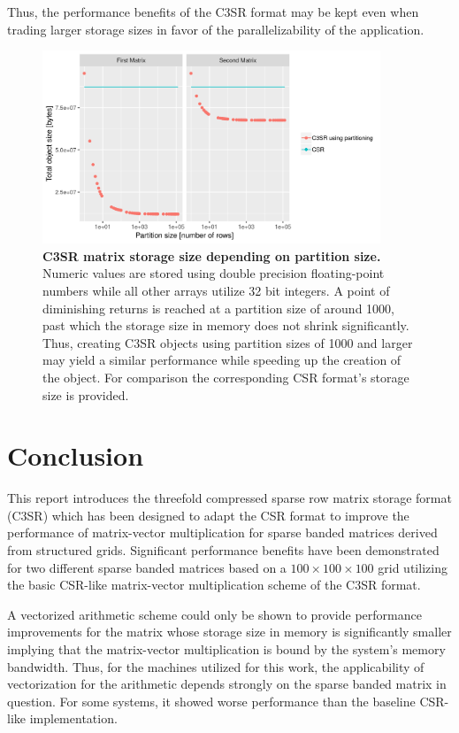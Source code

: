 \documentclass{article}
\begin{document}
    Thus, the performance benefits of the C3SR format may be kept even when trading larger storage sizes in favor of the parallelizability of the application.

    \begin{figure}[ht]
      \centering
      \includegraphics[width=0.9\textwidth]{assets/structured_grid_matrix_heap_size}
      \caption[C3SR matrix storage size depending on partition size]{\textbf{C3SR matrix storage size depending on partition size.} Numeric values are stored using double precision floating-point numbers while all other arrays utilize 32 bit integers. A point of diminishing returns is reached at a partition size of around 1000, past which the storage size in memory does not shrink significantly. Thus, creating C3SR objects using partition sizes of 1000 and larger may yield a similar performance while speeding up the creation of the object. For comparison the corresponding CSR format's storage size is provided.}
      \label{fig:structured_grid_matrix_heap_size}
    \end{figure}

\section{Conclusion}

  This report introduces the threefold compressed sparse row matrix storage format (C3SR) which has been designed to adapt the CSR format to improve the performance of matrix-vector multiplication for sparse banded matrices derived from structured grids. Significant performance benefits have been demonstrated for two different sparse banded matrices based on a $100 \times 100 \times 100$ grid utilizing the basic CSR-like matrix-vector multiplication scheme of the C3SR format.

  A vectorized arithmetic scheme could only be shown to provide performance improvements for the matrix whose storage size in memory is significantly smaller implying that the matrix-vector multiplication is bound by the system's memory bandwidth. Thus, for the machines utilized for this work, the applicability of vectorization for the arithmetic depends strongly on the sparse banded matrix in question. For some systems, it showed worse performance than the baseline CSR-like implementation.
\end{document}
